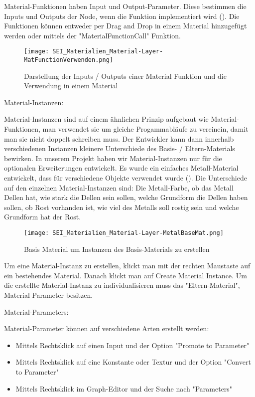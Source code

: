 {{Material-Funktionen haben Input und Output-Parameter. Diese bestimmen die Inputs und Outputs der Node, wenn die
Funktion implementiert wird (). Die Funktionen können entweder per Drag and
Drop in einem Material hinzugefügt werden oder mittels der "MaterialFunctionCall" Funktion.

\begin{figure}[H]
    \centering
    \texttt{[image: SEI\_Materialien\_Material-Layer-MatFunctionVerwenden.png]}
    \caption{Darstellung der Inputs / Outputs einer Material Funktion und die Verwendung in einem Material}
    \label{picture:use_mat_func}
\end{figure}

Material-Instanzen\citep{ue:mat_instances}:

Material-Instanzen sind auf einem ähnlichen Prinzip aufgebaut wie Material-Funktionen, man verwendet sie um gleiche
Progammabläufe zu vereinein, damit man sie nicht doppelt schreiben muss. Der Entwickler kann dann innerhalb
verschiedenen Instanzen kleinere Unterschiede des Basis- / Eltern-Materials bewirken. In unserem Projekt haben wir
Material-Instanzen nur für die optionalen Erweiterungen entwickelt. Es wurde ein einfaches Metall-Material entwickelt,
dass für verschiedene Objekte verwendet wurde (). Die Unterschiede auf
den einzelnen Material-Instanzen sind: Die Metall-Farbe, ob das Metall Dellen hat, wie stark die Dellen sein sollen,
welche Grundform die Dellen haben sollen, ob Rost vorhanden ist, wie viel des Metalls soll rostig sein und welche
Grundform hat der Rost.

\begin{figure}[H]
    \centering
    \texttt{[image: SEI\_Materialien\_Material-Layer-MetalBaseMat.png]}
    \caption{Basis Material um Instanzen des Basis-Materials zu erstellen}
    \label{picture:base_metal_material}
\end{figure}

Um eine Material-Instanz zu erstellen, klickt man mit der rechten Maustaste auf ein bestehendes Material. Danach klickt
man auf Create Material Instance. Um die erstellte Material-Instanz zu individualisieren muss das "Eltern-Material",
Material-Parameter besitzen.

Material-Parameters:

    Material-Parameter können auf verschiedene Arten  erstellt werden:
    \begin{itemize}
        \item  Mittels Rechtsklick auf einen Input und der Option "Promote to Parameter"
        \item  Mittels Rechtsklick auf eine Konstante oder Textur und der Option "Convert to Parameter"
        \item  Mittels Rechtsklick im Graph-Editor und der Suche nach "Parameters"
    \end{itemize}

}}
